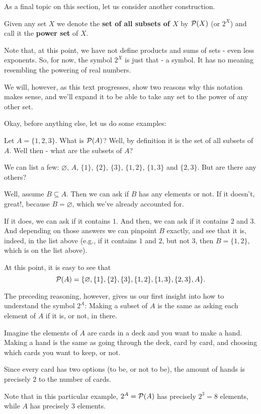\bigskip
As a final topic on this section, let us consider another construction.

\begin{df}
	Given any set $X$ we denote the \textbf{set of all subsets of $X$} by $\mathcal P(X)$ (or $2^X$) and call it the \textbf{power set} of $X$.
\end{df}
\begin{rmk}
	Note that, at this point, we have not define products and sums of sets - even less exponents. So, for now, the symbol $2^X$ is just that - a symbol. It has no meaning resembling the powering of real numbers.
	
	We will, however, as this text progresses, show two reasons why this notation makes sense, and we'll expand it to be able to take any set to the power of any other set.
\end{rmk}

Okay, before anything else, let us do some examples:
\begin{ex}
	Let $A=\{1,2,3\}$. What is $\mathcal P(A)$? Well, by definition it is the set of all subsets of $A$. Well then - what are the subsets of $A$?
	
	We can list a few: $\varnothing$, $A$, $\{1\}$, $\{2\}$, $\{3\}$, $\{1,2\}$, $\{1,3\}$ and $\{2,3\}$. But are there any others?
	
	Well, assume $B\subseteq A$. Then we can ask if $B$ has any elements or not. If it doesn't, great!, because $B=\varnothing$, which we've already accounted for.
	
	If it does, we can ask if it contains $1$. And then, we can ask if it contains $2$ and $3$. And depending on those answers we can pinpoint $B$ exactly, and see that it is, indeed, in the list above (e.g., if it contains $1$ and $2$, but not $3$, then $B=\{1,2\}$, which is on the list above).
	
	At this point, it is easy to see that\[\mathcal P(A)=\{\varnothing,\{1\},\{2\},\{3\},\{1,2\},\{1,3\},\{2,3\},A\}.\]
	
	The preceding reasoning, however, gives us our first insight into how to understand the symbol $2^A$: Making a subset of $A$ is the same as asking each element of $A$ if it is, or not, in there.
	
	Imagine the elements of $A$ are cards in a deck and you want to make a hand. Making a hand is the same as going through the deck, card by card, and choosing which cards you want to keep, or not.
	
	Since every card has two options (to be, or not to be), the amount of hands is precisely $2$ to the number of cards.
	
	Note that in this particular example, $2^A=\mathcal P(A)$ has precisely $2^3=8$ elements, while $A$ has precisely $3$ elements.
\end{ex}

